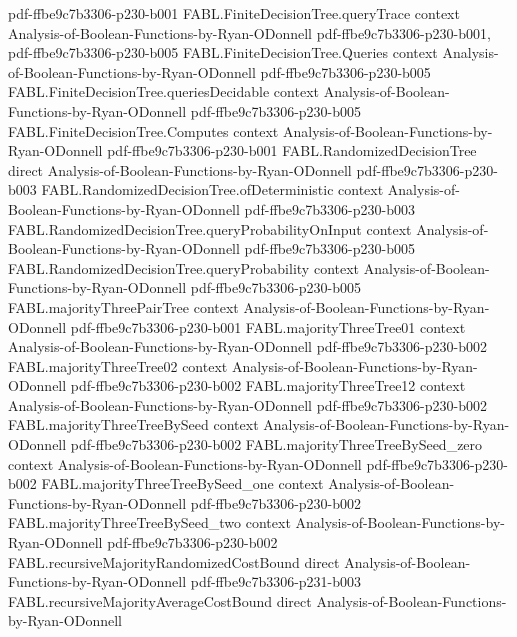 \begin{theorem}
  {pdf-ffbe9c7b3306-p230-b001}
\proofstep
  {FABL.FiniteDecisionTree.queryTrace}
  {context}
  {Analysis-of-Boolean-Functions-by-Ryan-ODonnell}
  {pdf-ffbe9c7b3306-p230-b001,
    pdf-ffbe9c7b3306-p230-b005}
\proofstep
  {FABL.FiniteDecisionTree.Queries}
  {context}
  {Analysis-of-Boolean-Functions-by-Ryan-ODonnell}
  {pdf-ffbe9c7b3306-p230-b005}
\proofstep
  {FABL.FiniteDecisionTree.queriesDecidable}
  {context}
  {Analysis-of-Boolean-Functions-by-Ryan-ODonnell}
  {pdf-ffbe9c7b3306-p230-b005}
\proofstep
  {FABL.FiniteDecisionTree.Computes}
  {context}
  {Analysis-of-Boolean-Functions-by-Ryan-ODonnell}
  {pdf-ffbe9c7b3306-p230-b001}
\proofstep
  {FABL.RandomizedDecisionTree}
  {direct}
  {Analysis-of-Boolean-Functions-by-Ryan-ODonnell}
  {pdf-ffbe9c7b3306-p230-b003}
\proofstep
  {FABL.RandomizedDecisionTree.ofDeterministic}
  {context}
  {Analysis-of-Boolean-Functions-by-Ryan-ODonnell}
  {pdf-ffbe9c7b3306-p230-b003}
\proofstep
  {FABL.RandomizedDecisionTree.queryProbabilityOnInput}
  {context}
  {Analysis-of-Boolean-Functions-by-Ryan-ODonnell}
  {pdf-ffbe9c7b3306-p230-b005}
\proofstep
  {FABL.RandomizedDecisionTree.queryProbability}
  {context}
  {Analysis-of-Boolean-Functions-by-Ryan-ODonnell}
  {pdf-ffbe9c7b3306-p230-b005}
\proofstep
  {FABL.majorityThreePairTree}
  {context}
  {Analysis-of-Boolean-Functions-by-Ryan-ODonnell}
  {pdf-ffbe9c7b3306-p230-b001}
\proofstep
  {FABL.majorityThreeTree01}
  {context}
  {Analysis-of-Boolean-Functions-by-Ryan-ODonnell}
  {pdf-ffbe9c7b3306-p230-b002}
\proofstep
  {FABL.majorityThreeTree02}
  {context}
  {Analysis-of-Boolean-Functions-by-Ryan-ODonnell}
  {pdf-ffbe9c7b3306-p230-b002}
\proofstep
  {FABL.majorityThreeTree12}
  {context}
  {Analysis-of-Boolean-Functions-by-Ryan-ODonnell}
  {pdf-ffbe9c7b3306-p230-b002}
\proofstep
  {FABL.majorityThreeTreeBySeed}
  {context}
  {Analysis-of-Boolean-Functions-by-Ryan-ODonnell}
  {pdf-ffbe9c7b3306-p230-b002}
\proofstep
  {FABL.majorityThreeTreeBySeed_zero}
  {context}
  {Analysis-of-Boolean-Functions-by-Ryan-ODonnell}
  {pdf-ffbe9c7b3306-p230-b002}
\proofstep
  {FABL.majorityThreeTreeBySeed_one}
  {context}
  {Analysis-of-Boolean-Functions-by-Ryan-ODonnell}
  {pdf-ffbe9c7b3306-p230-b002}
\proofstep
  {FABL.majorityThreeTreeBySeed_two}
  {context}
  {Analysis-of-Boolean-Functions-by-Ryan-ODonnell}
  {pdf-ffbe9c7b3306-p230-b002}
\proofstep
  {FABL.recursiveMajorityRandomizedCostBound}
  {direct}
  {Analysis-of-Boolean-Functions-by-Ryan-ODonnell}
  {pdf-ffbe9c7b3306-p231-b003}
\proofstep
  {FABL.recursiveMajorityAverageCostBound}
  {direct}
  {Analysis-of-Boolean-Functions-by-Ryan-ODonnell}

\end{theorem}

